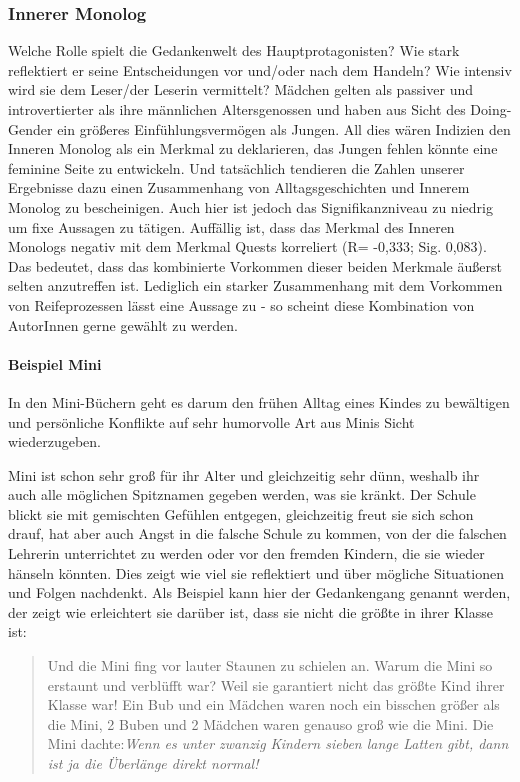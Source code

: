 \subsubsection{Innerer Monolog}

Welche Rolle spielt die Gedankenwelt des Hauptprotagonisten? Wie stark
reflektiert er seine Entscheidungen vor und/oder nach dem Handeln? Wie
intensiv wird sie dem Leser/der Leserin vermittelt? Mädchen gelten als
passiver und introvertierter als ihre männlichen Altersgenossen und
haben aus Sicht des Doing-Gender ein größeres Einfühlungsvermögen als
Jungen. All dies wären Indizien den Inneren Monolog als ein Merkmal zu
deklarieren, das Jungen fehlen könnte eine feminine Seite zu entwickeln.
Und tatsächlich tendieren die Zahlen unserer Ergebnisse dazu einen
Zusammenhang von Alltagsgeschichten und Innerem Monolog zu bescheinigen.
Auch hier ist jedoch das Signifikanzniveau zu niedrig um fixe Aussagen
zu tätigen. Auffällig ist, dass das Merkmal des Inneren Monologs negativ
mit dem Merkmal Quests korreliert (R= -0,333; Sig. 0,083). Das bedeutet,
dass das kombinierte Vorkommen dieser beiden Merkmale äußerst selten
anzutreffen ist. Lediglich ein starker Zusammenhang mit dem Vorkommen
von Reifeprozessen lässt eine Aussage zu - so scheint diese Kombination
von AutorInnen gerne gewählt zu werden.

\paragraph{Beispiel Mini}

In den Mini-Büchern geht es darum den frühen Alltag eines Kindes zu
bewältigen und persönliche Konflikte auf sehr humorvolle Art aus Minis
Sicht wiederzugeben.

Mini ist schon sehr groß für ihr Alter und gleichzeitig sehr dünn,
weshalb ihr auch alle möglichen Spitznamen gegeben werden, was sie
kränkt. Der Schule blickt sie mit gemischten Gefühlen entgegen,
gleichzeitig freut sie sich schon drauf, hat aber auch Angst in die
falsche Schule zu kommen, von der die falschen Lehrerin unterrichtet zu
werden oder vor den fremden Kindern, die sie wieder hänseln könnten.
Dies zeigt wie viel sie reflektiert und über mögliche Situationen und
Folgen nachdenkt. Als Beispiel kann hier der Gedankengang genannt
werden, der zeigt wie erleichtert sie darüber ist, dass sie nicht die
größte in ihrer Klasse ist:

\begin{quote}
Und die Mini fing vor lauter Staunen zu schielen an. \textelp{} Warum
die Mini so erstaunt und verblüfft war? Weil sie garantiert nicht das
größte Kind ihrer Klasse war! Ein Bub und ein Mädchen waren noch ein
bisschen größer als die Mini, 2 Buben und 2 Mädchen waren genauso groß
wie die Mini. Die Mini
dachte:\emph{Wenn es unter zwanzig Kindern sieben \emph{lange Latten} gibt, dann ist ja die Überlänge direkt normal!}\parencite[][61]{Noestlinger2011}
\end{quote}

